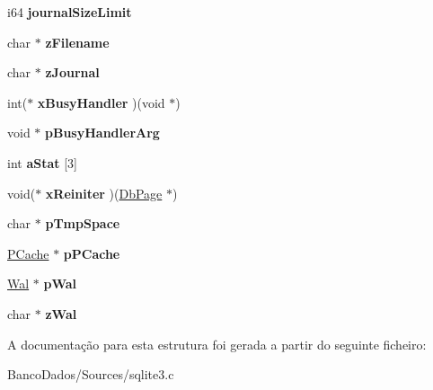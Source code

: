 \begin{DoxyCompactItemize}
\item 
\hypertarget{struct_pager_ae381db4e0b49f92596b0cdeb279e6bc6}{i64 {\bfseries journal\-Size\-Limit}}\label{struct_pager_ae381db4e0b49f92596b0cdeb279e6bc6}

\item 
\hypertarget{struct_pager_a2a55a044468f8658b7993e57087a5561}{char $\ast$ {\bfseries z\-Filename}}\label{struct_pager_a2a55a044468f8658b7993e57087a5561}

\item 
\hypertarget{struct_pager_ab36ce1f606c407ad3fc56a3651f5a319}{char $\ast$ {\bfseries z\-Journal}}\label{struct_pager_ab36ce1f606c407ad3fc56a3651f5a319}

\item 
\hypertarget{struct_pager_ac8477f7cc39fefd81b4089994e13d215}{int($\ast$ {\bfseries x\-Busy\-Handler} )(void $\ast$)}\label{struct_pager_ac8477f7cc39fefd81b4089994e13d215}

\item 
\hypertarget{struct_pager_a7a685e7a8dcbcd725c5a982fd8deb91b}{void $\ast$ {\bfseries p\-Busy\-Handler\-Arg}}\label{struct_pager_a7a685e7a8dcbcd725c5a982fd8deb91b}

\item 
\hypertarget{struct_pager_a0b3bb8afc7c4c82e0e99f3ad99dd0986}{int {\bfseries a\-Stat} \mbox{[}3\mbox{]}}\label{struct_pager_a0b3bb8afc7c4c82e0e99f3ad99dd0986}

\item 
\hypertarget{struct_pager_a632d3c81743a7f9104337ae3d45af04c}{void($\ast$ {\bfseries x\-Reiniter} )(\hyperlink{struct_pg_hdr}{Db\-Page} $\ast$)}\label{struct_pager_a632d3c81743a7f9104337ae3d45af04c}

\item 
\hypertarget{struct_pager_a64934188c72599e0be9ae54d3fc1cc92}{char $\ast$ {\bfseries p\-Tmp\-Space}}\label{struct_pager_a64934188c72599e0be9ae54d3fc1cc92}

\item 
\hypertarget{struct_pager_ae2495e45e354e92a858144386f91cab3}{\hyperlink{struct_p_cache}{P\-Cache} $\ast$ {\bfseries p\-P\-Cache}}\label{struct_pager_ae2495e45e354e92a858144386f91cab3}

\item 
\hypertarget{struct_pager_a2c759424108248d8b08e6f400fab14dd}{\hyperlink{struct_wal}{Wal} $\ast$ {\bfseries p\-Wal}}\label{struct_pager_a2c759424108248d8b08e6f400fab14dd}

\item 
\hypertarget{struct_pager_ac63ab281e48f9ac8521b85c1a90475b3}{char $\ast$ {\bfseries z\-Wal}}\label{struct_pager_ac63ab281e48f9ac8521b85c1a90475b3}

\end{DoxyCompactItemize}


A documentação para esta estrutura foi gerada a partir do seguinte ficheiro\-:\begin{DoxyCompactItemize}
\item 
Banco\-Dados/\-Sources/sqlite3.\-c\end{DoxyCompactItemize}
